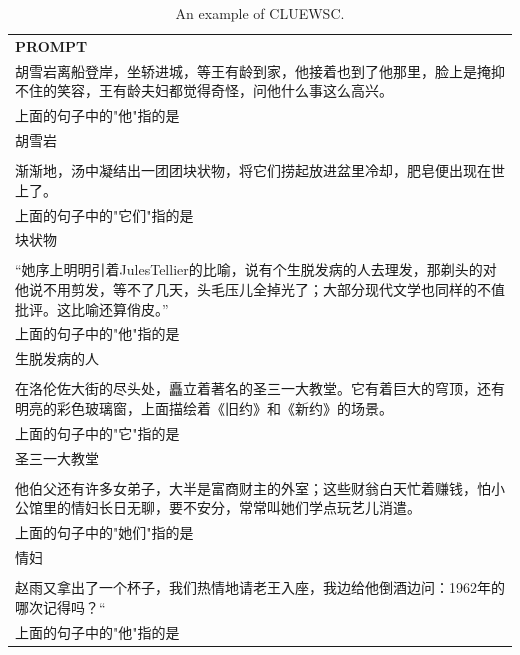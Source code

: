 \begin{table}[h]
    \centering \small
\begin{tabular}{p{12cm}}
\toprule
\textbf{PROMPT}\\
胡雪岩离船登岸，坐轿进城，等王有龄到家，他接着也到了他那里，脸上是掩抑不住的笑容，王有龄夫妇都觉得奇怪，问他什么事这么高兴。
\\上面的句子中的"他"指的是
\\胡雪岩
\\
\\渐渐地，汤中凝结出一团团块状物，将它们捞起放进盆里冷却，肥皂便出现在世上了。
\\上面的句子中的"它们"指的是
\\块状物
\\
\\“她序上明明引着JulesTellier的比喻，说有个生脱发病的人去理发，那剃头的对他说不用剪发，等不了几天，头毛压儿全掉光了；大部分现代文学也同样的不值批评。这比喻还算俏皮。”
\\上面的句子中的"他"指的是
\\生脱发病的人
\\
\\在洛伦佐大街的尽头处，矗立着著名的圣三一大教堂。它有着巨大的穹顶，还有明亮的彩色玻璃窗，上面描绘着《旧约》和《新约》的场景。
\\上面的句子中的"它"指的是
\\圣三一大教堂
\\
\\他伯父还有许多女弟子，大半是富商财主的外室；这些财翁白天忙着赚钱，怕小公馆里的情妇长日无聊，要不安分，常常叫她们学点玩艺儿消遣。
\\上面的句子中的"她们"指的是
\\情妇
\\
\\赵雨又拿出了一个杯子，我们热情地请老王入座，我边给他倒酒边问：1962年的哪次记得吗？“
\\上面的句子中的"他"指的是\\
\bottomrule
\end{tabular}
    \caption{\centering An example of CLUEWSC.}
    \label{tab:cluewsc_eval_format_example}
\end{table}


